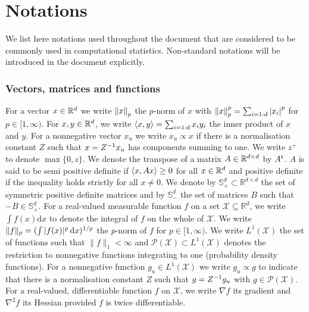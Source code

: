
\chapter*{Notations}
\setcounter{page}{1}

We list here notations used throughout the document that are considered to be commonly used in computational statistics. Non-standard notations will be introduced in the document explicitly.

\subsection*{Vectors, matrices and functions} 
For a vector $x\in\mathbb R^{d}$ we write $\left\|x\right\|_{p}$ the $p$-norm of $x$ with $\left\|x\right\|_{p}^{p}=\sum_{i=1:d}\left|x_{i}\right|^{p}$ for $p\in[1,\infty)$. 
For $x,y\in\mathbb R^{d}$, we write $\left\langle x,y \right\rangle=\sum_{i=1:d}x_{i}y_{i}$ the inner product of $x$ and $y$. For a nonnegative vector $x_u$ we write $x_u\propto x$ if there is a normalisation constant $Z$ such that $x=Z^{-1} x_u$ has components summing to one.
We write $z^{+}$ to denote $\max\{0, z\}$. 
We denote the transpose of a matrix $A\in\mathbb R^{d\times d}$ by $A^\mathrm{t}$. $A$ is said to be semi positive definite if $\left\langle x,Ax \right\rangle\ge 0$ for all $x\in\mathbb R^{d}$ and positive definite if the inequality holds strictly for all $x\neq 0$. We denote by $\mathbb S_+^{d}\subset \mathbb R^{d\times d}$ the set of symmetric positive definite matrices and by $\mathbb S_-^{d}$ the set of matrices $B$ such that $-B\in\mathbb S_+^{d}$.
For a real-valued measurable function $f$ on a set $\mathcal X\subseteq \mathbb R^{d}$, we write $\int f(x)\mathrm d{x}$ to denote the integral of $f$ on the whole of $\mathcal X$. We write $\|f\|_{p}=(\int |f(x)|^{p}\,\mathrm{d} x)^{1/p}$ the $p$-norm of $f$ for $p\in[1,\infty)$. 
We write $L^{1}(\mathcal X)$ the set of functions such that $\|f\|_{1}<\infty$ and $\mathcal P(\mathcal X) \subset L^{1}(\mathcal X)$ denotes the restriction to nonnegative functions integrating to one (probability density functions). For a nonnegative function $g_u\in  L^{1}(\mathcal X)$ we write $g_u\propto g$ to indicate that there is a normalisation constant $Z$ such that $g=Z^{-1} g_u$ with $g\in\mathcal P(\mathcal X)$.  
For a real-valued, differentiable function $f$ on $\mathcal X$, we write $\nabla f$ its gradient and $\nabla^{2} f$ its Hessian provided $f$ is twice differentiable. 
%
